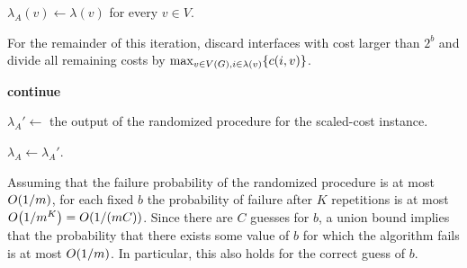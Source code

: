 \begin{algorithm}[H]
\caption{Preprocessing algorithm} \label{alg:preprocessing}
$\lambda_A(v) \gets \lambda(v)$ for every $v\in V$.

{
    For the remainder of this iteration, discard interfaces with cost larger than $2^b$ and divide all remaining costs by $\max_{v\in V\mathopen{}\left( G \right), i\in \lambda\mathopen{}\left( v \right)} \mathopen{}\left\{ c(i,v) \right\}$.

    {
        \textbf{continue}
    }

    {
        $\lambda_A' \gets$ the output of the randomized procedure for the scaled-cost instance.

        {
            $\lambda_A \gets \lambda_A'$.
        }
    }
}

\end{algorithm}

Assuming that the failure probability of the randomized procedure is at most $O\mathopen{}\left( 1/m \right)$, for each fixed $b$ the probability of failure after $K$ repetitions is at most $O\mathopen{}\left( 1/m^K \right)=O\mathopen{}\left( 1/(mC) \right)$. Since there are $C$ guesses for $b$, a union bound implies that the probability that there exists some value of $b$ for which the algorithm fails is at most $O\mathopen{}\left( 1/m \right)$. In particular, this also holds for the correct guess of $b$.